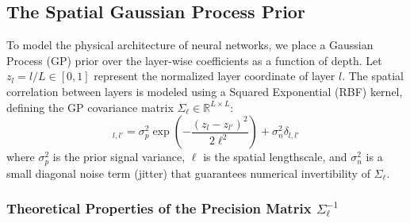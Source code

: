 \subsection{The Spatial Gaussian Process Prior}

To model the physical architecture of neural networks, we place a Gaussian
Process (GP) prior over the layer-wise coefficients as a function of depth. Let
$z_l = l/L \in [0, 1]$ represent the normalized layer coordinate of layer $l$.
The spatial correlation between layers is modeled using a Squared Exponential
(RBF) kernel, defining the GP covariance matrix $\Sigma_{\ell} \in \mathbb{R}^{L
\times L}$:
\begin{equation}
[\Sigma_{\ell}]_{l, l'} = \sigma_p^2 \exp\left( - \frac{(z_l -
z_{l'})^2}{2\ell^2} \right) + \sigma_n^2 \delta_{l, l'}
\label{eq:gp_kernel}
\end{equation}
where $\sigma_p^2$ is the prior signal variance, $\ell$ is the spatial
lengthscale, and $\sigma_n^2$ is a small diagonal noise term (jitter) that
guarantees numerical invertibility of $\Sigma_{\ell}$.

\subsubsection{Theoretical Properties of the Precision Matrix $\Sigma_{\ell}^{-1}$}

